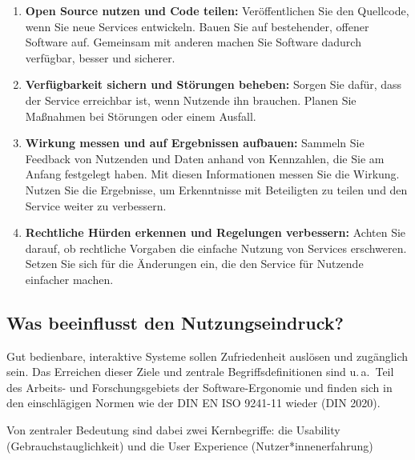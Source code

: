 \documentclass[
  11pt,
  letterpaper,
  DIV=11,
  twoside]{scrreprt}
\begin{document}
\begin{enumerate}
  Anfang an dafür, dass der Service sicher ist und auch bei
  außergewöhnlich hoher Belastung funktioniert. Stellen Sie sicher, dass
  es Unterstützung gibt, wenn Nutzende sie brauchen.
\item
  \textbf{Open Source nutzen und Code teilen:} Veröffentlichen Sie den
  Quellcode, wenn Sie neue Services entwickeln. Bauen Sie auf
  bestehender, offener Software auf. Gemeinsam mit anderen machen Sie
  Software dadurch verfügbar, besser und sicherer.
\item
  \textbf{Verfügbarkeit sichern und Störungen beheben:} Sorgen Sie
  dafür, dass der Service erreichbar ist, wenn Nutzende ihn brauchen.
  Planen Sie Maßnahmen bei Störungen oder einem Ausfall.
\item
  \textbf{Wirkung messen und auf Ergebnissen aufbauen:} Sammeln Sie
  Feedback von Nutzenden und Daten anhand von Kennzahlen, die Sie am
  Anfang festgelegt haben. Mit diesen Informationen messen Sie die
  Wirkung. Nutzen Sie die Ergebnisse, um Erkenntnisse mit Beteiligten zu
  teilen und den Service weiter zu verbessern.
\item
  \textbf{Rechtliche Hürden erkennen und Regelungen verbessern:} Achten
  Sie darauf, ob rechtliche Vorgaben die einfache Nutzung von Services
  erschweren. Setzen Sie sich für die Änderungen ein, die den Service
  für Nutzende einfacher machen.
\end{enumerate}

\subsection{Was beeinflusst den
Nutzungseindruck?}\label{sec-nutzungseindruck}

Gut bedienbare, interaktive Systeme sollen Zufriedenheit auslösen und
zugänglich sein. Das Erreichen dieser Ziele und zentrale
Begriffsdefinitionen sind u.\,a.~Teil des Arbeits- und Forschungsgebiets
der Software-Ergonomie und finden sich in den einschlägigen Normen wie
der DIN EN ISO 9241-11 wieder (DIN 2020).

Von zentraler Bedeutung sind dabei zwei Kernbegriffe: die Usability
(Gebrauchstauglichkeit) und die User Experience (Nutzer*innenerfahrung)
\end{document}
